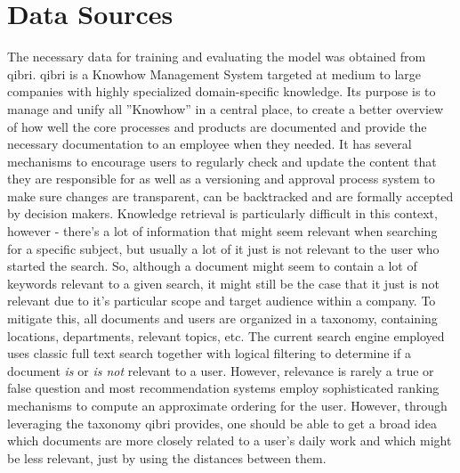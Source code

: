 \documentclass[draft,final]{vutinfth} %
\begin{document}
\section{Data Sources}
The necessary data for training and evaluating the model was obtained from qibri.
qibri is a Knowhow Management System targeted at medium to large companies with highly specialized domain-specific knowledge. Its purpose is to manage and unify all ''Knowhow'' in a central place, to create a better overview of how well the core processes and products are documented and provide the necessary documentation to an employee when they needed. It has several mechanisms to encourage users to regularly check and update the content that they are responsible for as well as a versioning and approval process system to make sure changes are transparent, can be backtracked and are formally accepted by decision makers. Knowledge retrieval is particularly difficult in this context, however - there's a lot of information that might seem relevant when searching for a specific subject, but usually a lot of it just is not relevant to the user who started the search. So, although a document might seem to contain a lot of keywords relevant to a given search, it might still be the case that it just is not relevant due to it's particular scope and target audience within a company. To mitigate this, all documents and users are organized in a taxonomy, containing locations, departments, relevant topics, etc. The current search engine employed uses classic full text search together with logical filtering to determine if a document \textit{is} or \textit{is not} relevant to a user. However, relevance is rarely a true or false question and most recommendation systems employ sophisticated ranking mechanisms to compute an approximate ordering for the user. However, through leveraging the taxonomy qibri provides, one should be able to get a broad idea which documents are more closely related to a user's daily work and which might be less relevant, just by using the distances between them.
\end{document}
